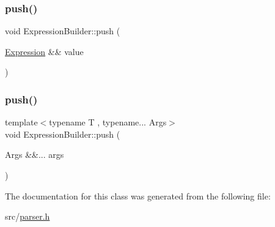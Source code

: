 \subsubsection{\texorpdfstring{push()}{push()}\hspace{0.1cm}{\footnotesize\ttfamily [1/2]}}
{\footnotesize\ttfamily void Expression\+Builder\+::push (\begin{DoxyParamCaption}\item[{\hyperlink{ast_8h_a4cb273a4d960cd13ea17d08f254493e8}{Expression} \&\&}]{value }\end{DoxyParamCaption})\hspace{0.3cm}{\ttfamily [inline]}}

\mbox{\label{class_expression_builder_ad9f2da939e7864548ae857d40405160a}} 
\subsubsection{\texorpdfstring{push()}{push()}\hspace{0.1cm}{\footnotesize\ttfamily [2/2]}}
{\footnotesize\ttfamily template$<$typename T , typename... Args$>$ \\
void Expression\+Builder\+::push (\begin{DoxyParamCaption}\item[{Args \&\&...}]{args }\end{DoxyParamCaption})\hspace{0.3cm}{\ttfamily [inline]}}



The documentation for this class was generated from the following file\+:\begin{DoxyCompactItemize}
\item 
src/\hyperlink{parser_8h}{parser.\+h}\end{DoxyCompactItemize}

